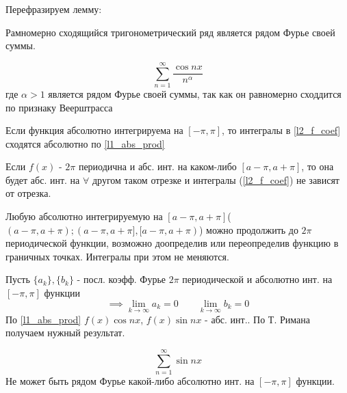 \documentclass{article}
\begin{document}
Перефразируем лемму:
\begin{lemma}
  Рамномерно сходящийся тригонометрический ряд является рядом Фурье своей суммы. 
\end{lemma}
\begin{eg}
  \[
    \sum_{n=1}^{\infty}\frac{\cos nx}{n^{\alpha}}
  \]
  где $\alpha>1$ является рядом Фурье своей суммы, так  как он
  равномерно сходдится по признаку Веерштрасса
\end{eg}
\begin{remark}
  Если функция абсолютно интегрируема на $[-\pi,\pi]$, то интегралы
  в \ref{l2_f_coef} сходятся абсолютно по \ref{l1_abs_prod}
\end{remark}
\begin{remark}
  Если $f(x)$ - $2\pi$ периодична и абс. инт. на каком-либо $[a-\pi,a+\pi]$,
  то она будет абс. инт. на $\forall$ другом таком отрезке и
  интегралы (\ref{l2_f_coef}) не зависят от отрезка.
\end{remark}
\begin{remark}
  Любую абсолютно интегрируемую на $[a-\pi,a+\pi]$($(a-\pi,a+\pi);(a-\pi,a+\pi], [a-\pi,a+\pi)$)
  можно продолжить до $2\pi$ периодической функции,
  возможно доопределив или переопределив функцию в граничных точках.
  Интегралы при этом не меняются.
\end{remark}
\begin{corollary}
  Пусть $\{a_k\}, \{b_k\}$ - посл. коэфф. Фурье $2\pi$ периодической 
  и абсолютно инт. на $[-\pi,\pi]$ функции \[
    \implies \lim\limits_{k\to\infty} a_k=0 \qquad \lim\limits_{k\to\infty} b_k=0
  \]
  По \ref{l1_abs_prod} 
  $f(x)\cos nx$, $f(x) \sin nx $ - абс. инт.. По Т. Римана получаем нужный результат.
\end{corollary}
\begin{eg}
  \[
    \sum_{n=1}^{\infty}\sin nx
  \]
  Не может быть рядом Фурье какой-либо абсолютно инт. на $[-\pi,\pi]$ функции.
\end{eg}
\end{document}

